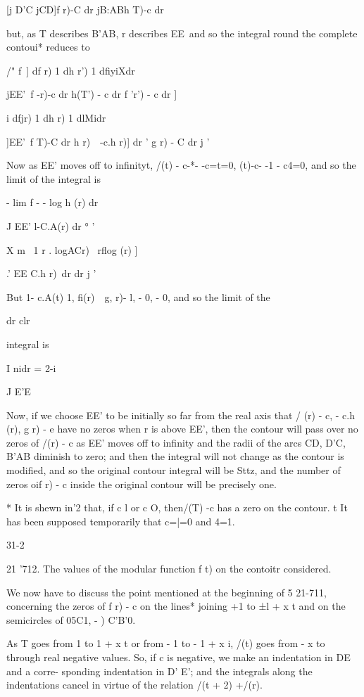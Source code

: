 [j D'C jCD]f r)-C dr jB:ABh T)-c dr

but, as T describes B'AB, r describes EE\ and so the integral round
the complete contoui* reduces to

/" f\ ] df r) 1 dh r') 1 dfiyiXdr

jEE'\ f -r)-c dr h(T') - c dr f 'r') - c dr ]

 i dfjr) 1 dh r) 1 dlMidr

]EE'\ f T)-C dr h r)\ \ -c.h r)] dr ' g r) - C dr j '

Now as EE' moves off to infinityt, /(t) - c-*- -c=t=0, (t)-c- -1 -
c4=0, and so the limit of the integral is

- lim f - - log h (r) dr

J EE' l-C.A(r) dr ° '

 X m \ 1 r . logACr) \ rflog (r) ]

.' EE C.h r)\ dr dr j '

But 1- c.A(t) 1, fi(r)~ \,g, r)- l, - 0, - 0, and so the limit of the

dr clr

integral is

I nidr = 2-i

J E'E

Now, if we choose EE' to be initially so far from the real axis that /
(r) - c, - c.h (r), g r) - e have no zeros when r is above EE', then
the contour will pass over no zeros of /(r) - c as EE' moves off to
infinity and the radii of the arcs CD, D'C, B'AB diminish to zero;
and then the integral will not change as the contour is modified, and
so the original contour integral will be Sttz, and the number of zeros
oif r) - c inside the original contour will be precisely one.

* It is shewn in'2 that, if c l or c O, then/(T) -c has a zero
on the contour. t It has been supposed temporarily that c=|=0 and 4=1.

31-2

%
%

21 '712. The values of the modular function f t) on the contoitr
considered.

We now have to discuss the point mentioned at the beginning of 5
21-711, concerning the zeros of f r) - c on the lines* joining +1 to
±l + x t and on the semicircles of 05C1, - ) C'B'0.

As T goes from 1 to 1 + x t or from - 1 to - 1 + x i, /(t) goes from -
x to through real negative values. So, if c is negative, we make an
indentation in DE and a corre- sponding indentation in D' E'; and the
integrals along the indentations cancel in virtue of the relation /(t
+ 2) +/(r).

